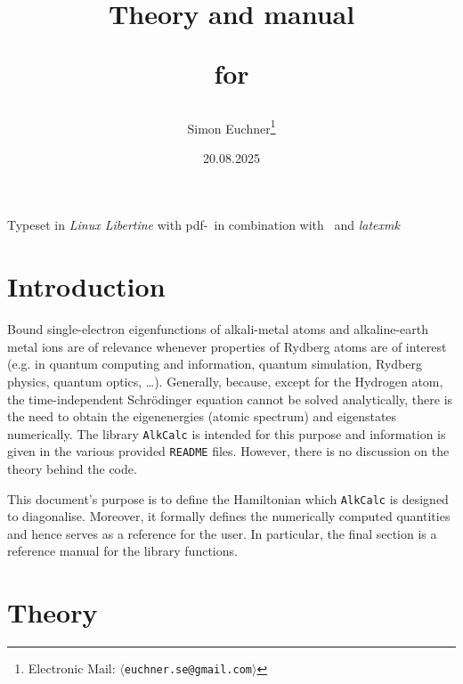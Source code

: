 \documentclass[fontsize=12pt,
               twoside=false,
               BCOR=0mm,
               DIV=14,
               overfullrule=true, %
               toc=bibliography,
               headinclude=true,
               footinclude=false]{scrartcl}
\title{Theory and manual\par\vspace*{5mm}for\par\vspace*{5mm}\alkcalc}%
\author{Simon Euchner\footnote{Electronic Mail: %
        $\langle$\texttt{euchner.se@gmail.com}$\rangle$}%
       }
\date{20.08.2025}
\numberwithin{equation}{section}
\newcommand{\alkcalc}{\texttt{AlkCalc} }
\begin{document}
    \renewcommand{\pagemark}{}
    \maketitle%
    \newpage%

    \pagestyle{plain.scrheadings}%


    \def\TOCLineFilling{\xleaders\hbox to.6em{\hfil{\tiny$\circ$\hfil}}\hfil}%

    \DeclareTOCStyleEntry[linefill=\TOCLineFilling]{tocline}{section}%

    \vspace*{2cm}
    \tableofcontents%
    \vfill
    {Typeset in \emph{Linux Libertine} with pdf-\LaTeXe \ in combination with
     \KOMAScript \ and \emph{latexmk}}
    \newpage

    \pagestyle{scrheadings}%
    \setcounter{page}{1}%
    \renewcommand{\pagemark}{\thepage}%

    \section{Introduction}
    \label{sec:introduction}

    Bound single-electron eigenfunctions of alkali-metal atoms and
    alkaline-earth metal ions are of relevance whenever properties of Rydberg
    atoms are of interest (e.g. in quantum computing and information, quantum
    simulation, Rydberg physics, quantum optics, \dots). Generally, because,
    except for the Hydrogen atom, the time-independent Schr\"odinger equation
    cannot be solved analytically, there is the need to obtain the eigenenergies
    (atomic spectrum) and eigenstates numerically. The library \alkcalc is
    intended for this purpose and information is given in the various provided
    \texttt{README} files. However, there is no discussion on the theory behind
    the code.

    This document's purpose is to define the Hamiltonian which \alkcalc is
    designed to diagonalise. Moreover, it formally defines the numerically
    computed quantities and hence serves as a reference for the user. In
    particular, the final section is a reference manual for the library
    functions.

    \section{Theory}
    \label{sec:Theory}
\end{document}
